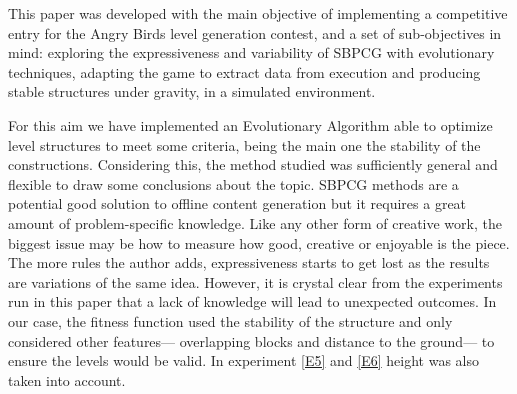 \documentclass[a4paper,twoside]{article}
\begin{document}

This paper was developed with the main objective of implementing a
competitive entry for the Angry Birds level generation contest, and  a
set of sub-objectives in mind: exploring the expressiveness and variability of 
SBPCG with evolutionary techniques, adapting the game to extract data from 
execution and producing stable structures under gravity, in a simulated environment.

For this aim we have implemented an Evolutionary Algorithm able to optimize 
level structures to meet some criteria, being the main one the stability of the 
constructions.
Considering this, the method studied was
sufficiently general and flexible to draw some conclusions about the
topic. SBPCG methods are a potential good solution to offline content
generation but it requires a great amount of problem-specific
knowledge. Like any other form of creative work, the biggest issue may
be how to measure how good, creative or enjoyable is the piece. The
more rules the author adds, expressiveness starts to get lost as the
results are variations of the same idea. However, it is crystal clear
from the experiments run in this paper that a lack of knowledge
will lead to unexpected outcomes.
In our case, the fitness function used the 
stability of the structure and only considered other features--- overlapping 
blocks and distance to the ground--- to ensure the levels would be valid.
In experiment \ref{E5} and \ref{E6} height was also taken into account.
\end{document}
